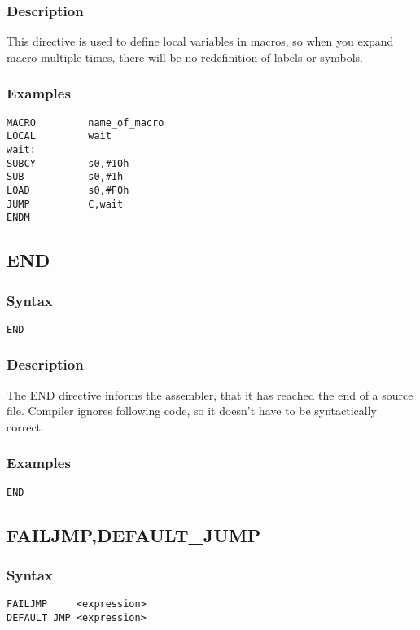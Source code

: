         \subsubsection{Description}
            This directive is used to define local variables in macros, so when you expand macro multiple times, there will be no redefinition of labels or symbols.

        \subsubsection{Examples}
            \verb'MACRO         name_of_macro'\\
            \verb'LOCAL         wait'\\
            \verb'wait:'\\
            \verb'SUBCY         s0,#10h'\\
            \verb'SUB           s0,#1h' \\
            \verb'LOAD          s0,#F0h'\\
            \verb'JUMP          C,wait'\\
            \verb'ENDM'

    \subsection{END}
        \subsubsection{Syntax}
            \verb'END'

        \subsubsection{Description}
            The END directive informs the assembler, that it has reached the end of a source file. Compiler ignores following code, so it doesn't have to be syntactically correct.

        \subsubsection{Examples}
                \verb'END'

    \subsection{FAILJMP,DEFAULT\_JUMP}
        \subsubsection{Syntax}
            \verb'FAILJMP     <expression>'\\
            \verb'DEFAULT_JMP <expression>'

